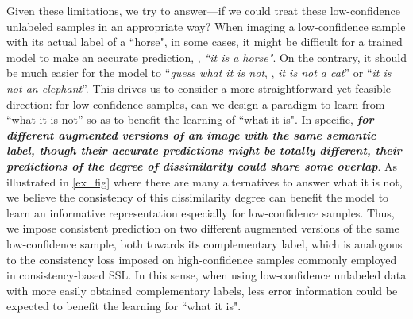 \documentclass[lettersize,journal]{IEEEtran}
\theoremstyle{plain}
\theoremstyle{definition}
\theoremstyle{remark}
\begin{document}
Given these limitations, we try to answer---if we could treat these low-confidence unlabeled samples in an appropriate way? When imaging a low-confidence sample with its actual label of a ``horse", in some cases, it might be difficult for a trained model to make an accurate prediction, \ie, \textit{``it is a horse"}. On the contrary, it should be much easier for the model to ``\textit{guess what it is not}, \eg, \textit{it is not a cat}'' or ``\textit{it is not an elephant}''.
This drives us to consider a more straightforward yet feasible direction: for low-confidence samples, can we design a paradigm to learn from ``what it is not'' so as to benefit the learning of ``what it is".
In specific, \textbf{\textit{for different augmented versions of an image with the same semantic label, though their accurate predictions might be totally different, their predictions of the degree of dissimilarity could share some overlap}}. As illustrated in \cref{ex_fig} where there are many alternatives to answer what it is not, we believe the consistency of this dissimilarity degree can benefit the model to learn an informative representation especially for low-confidence samples. Thus, 
we  impose consistent prediction on two different augmented versions of the same low-confidence sample, both towards its complementary label, which is analogous to the consistency loss imposed on high-confidence samples commonly employed in consistency-based SSL. 
In this sense, when using low-confidence unlabeled data with more easily obtained complementary labels, less error information could be expected to benefit the learning for ``what it is".
\end{document}
